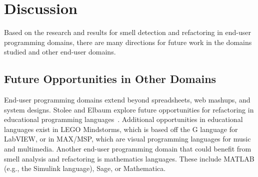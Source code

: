 \documentclass[10pt,conference,compsocconf]{IEEEtran}
\begin{document}
%
%
%

\section{Discussion}
\label{sec:discussion}

Based on the research and results for smell detection and refactoring in end-user programming domains, there are many directions for future work in the domains studied and other end-user domains.

\subsection{Future Opportunities in Other Domains}
End-user programming domains extend beyond spreadsheets, web mashups, and system designs. Stolee and Elbaum explore future opportunities for refactoring in educational programming languages~\cite{StoleeTSE2013}. Additional opportunities in educational languages exist in LEGO Mindstorms, which is based off the G language for LabVIEW, or in MAX/MSP, which are visual programming languages for music and multimedia.  Another end-user programming domain that could benefit from smell analysis and refactoring is mathematics languages. These include MATLAB (e.g., the Simulink language), Sage, or Mathematica.
\end{document}
